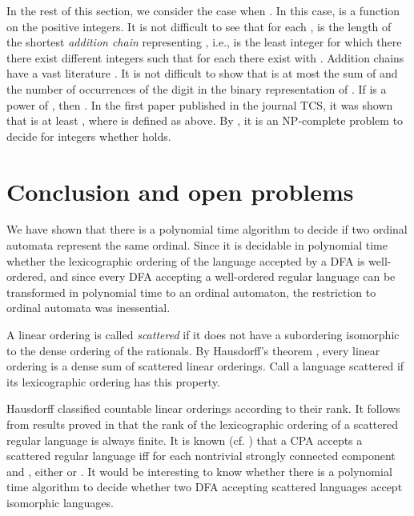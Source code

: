 \documentclass[copyright]{eptcs}
\begin{document}
In the rest of this section, we consider the case when .
In this case,  is a function on the positive integers. It is
not difficult to see that for each , 
 is the length of the shortest \emph{addition chain} \cite{Guy} 
representing , 
i.e.,  is the least integer  for which there there exist 
different integers  such that for each 
 there exist  with .
Addition chains have a vast literature
\cite{Sloane} . It is not difficult to show that
 is at most the sum of  and the number  of occurrences 
of the digit  in the binary representation of . If  is a power 
of , then . 
In the first paper \cite{Schonhage} published in the journal TCS, it was shown that  
is at least , where  is defined as above.  
By \cite{Downeyetal}, it is an NP-complete problem to decide for 
integers  whether  holds.  















\section{Conclusion and open problems}


We have shown that there is a polynomial time algorithm
to decide if two ordinal automata represent the same ordinal.
Since it is decidable in polynomial time whether the 
lexicographic ordering of the language accepted by a 
DFA is well-ordered, and since every DFA accepting a 
well-ordered regular language can be transformed in
polynomial time to an ordinal automaton, the restriction 
to ordinal automata was inessential.

A linear ordering is called \emph{scattered} if it does not have
a subordering isomorphic to the dense ordering of the rationals.
By Hausdorff's theorem \cite{Rosenstein}, every linear ordering is a dense 
sum of scattered linear orderings. Call a language 
scattered if its lexicographic ordering has this
property.

Hausdorff classified countable linear orderings according 
to their rank. It follows from results proved in
\cite{Heilbrunner} that the rank of the 
lexicographic ordering of a scattered regular language is always
finite. It is known (cf. \cite{BEscattered}) 
that a CPA  accepts a scattered regular language
iff for each nontrivial strongly connected component  
and , either  or .
It would be interesting to know whether there is 
a polynomial time algorithm to decide whether two DFA 
accepting scattered languages accept isomorphic languages.
\end{document}
